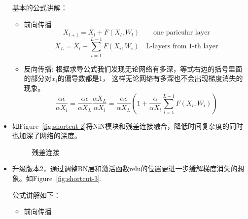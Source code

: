 \documentclass{article}
\begin{document}
\begin{CJK}{UTF8}{gbsn}
\begin{itemize}
    基本的公式讲解：
    \begin{itemize}
        \item 前向传播
        \begin{equation}
            X_{l+1} = X_l + F(X_l,W_l) \qquad \text{one paricular layer}
        \end{equation}
        \begin{equation}
            X_L = X_l + \sum_{i=1}^{L-1} F(X_i,W_i) \quad \text{L-layers from $1$-th layer}
        \end{equation}
        \item 反向传播: 根据求导公式我们发现无论网络有多深，等式右边的括号里面的部分对$x_i$的偏导数都是1，
        这样无论网络有多深也不会出现梯度消失的现象。
        \begin{equation}
            \frac{\alpha\epsilon}{\alpha X_l} = \frac{\alpha\epsilon}{\alpha X_L}\frac{\alpha X_L}{\alpha X_l}
             = \frac{\alpha\epsilon}{\alpha X_L}(1+\frac{\alpha}{\alpha X_l}\sum_{i=1}^{L-1}F(X_i,W_i)) 
        \end{equation}
        
    \end{itemize}
    
    \item 如Figure~\ref{fig:shortcut-2}将NiN模块和残差连接融合，降低时间复杂度的同时也加深了网络的深度。
    \begin{figure}[!h]
        \centering
        \hfill
        \caption{残差连接}
        \label{fig:shortcut-connection}
    \end{figure}

    \item 升级版本2，通过调整BN层和激活函数relu的位置更进一步缓解梯度消失的想象。如Figure~\ref{fig:shortcut-3}.
    
    公式讲解如下：
    \begin{itemize}
        \item 前向传播 
        

\end{itemize}
\end{itemize}
\end{CJK}
\end{document}
